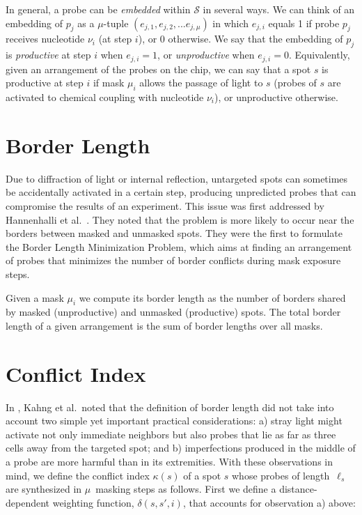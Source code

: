 \documentclass{llncs}
\begin{document}
In general, a probe can be \emph{embedded} within $\mathcal{S}$ in several ways. We can think of an embedding of $p_{j}$ as a $\mu$-tuple $(e_{j,1}, e_{j,2}, ... e_{j,\mu})$ in which $e_{j,i}$ equals 1 if probe $p_{j}$ receives nucleotide $\nu_{i}$ (at step $i$), or 0 otherwise. We say that the embedding of $p_{j}$ is \emph{productive} at step $i$ when $e_{j,i} = 1$, or \emph{unproductive} when $e_{j,i} = 0$. Equivalently, given an arrangement of the probes on the chip, we can say that a spot $s$ is productive at step $i$ if mask $\mu_{i}$ allows the passage of light to $s$ (probes of $s$ are activated to chemical coupling with nucleotide $\nu_{i}$), or unproductive otherwise.

\section{Border Length}

Due to diffraction of light or internal reflection, untargeted spots can sometimes be accidentally activated in a certain step, producing unpredicted probes that can compromise the results of an experiment. This issue was first addressed by Hannenhalli et al.\ \cite{HANNENHALLI02}. They noted that the problem is more likely to occur near the borders between masked and unmasked spots. They were the first to formulate the Border Length Minimization Problem, which aims at finding an arrangement of probes that minimizes the number of border conflicts during mask exposure steps.

Given a mask $\mu_{i}$ we compute its border length as the number of borders shared by masked (unproductive) and unmasked (productive) spots. The total border length of a given arrangement is the sum of border lengths over all masks.

\section{Conflict Index}

In \cite{KAHNG03}, Kahng et al.\ noted that the definition of border length did not take into account two simple yet important practical considerations: a) stray light might activate not only immediate neighbors but also probes that lie as far as three cells away from the targeted spot; and b) imperfections produced in the middle of a probe are more harmful than in its extremities. With these observations in mind, we define the conflict index $\kappa(s)$ of a spot $s$ whose probes of length~$\ell_{s}$ are synthesized in $\mu$~masking steps as follows. First we define a distance-dependent weighting function, $\delta(s,s',i)$, that accounts for observation a) above:
\end{document}
